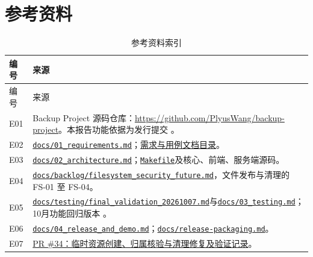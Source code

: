 \section*{参考资料}
\begin{longtable}{L{.10\linewidth}L{.79\linewidth}}
\caption{参考资料索引}\label{tab:references}\\
\toprule 编号 & 来源\\\midrule\endfirsthead\toprule 编号 & 来源\\\midrule\endhead
E01 & Backup Project 源码仓库：\url{https://github.com/PlyusWang/backup-project}。本报告功能依据为发行提交 。\\
E02 & \href{https://github.com/PlyusWang/backup-project/blob/0c07045ec7d4ff7dc6fa3646425c0d119a0f3e6c/docs/01_requirements.md}{\nolinkurl{docs/01_requirements.md}}；\href{https://github.com/PlyusWang/backup-project/tree/0c07045ec7d4ff7dc6fa3646425c0d119a0f3e6c/docs/requirements/}{需求与用例文档目录}。\\
E03 & \href{https://github.com/PlyusWang/backup-project/blob/0c07045ec7d4ff7dc6fa3646425c0d119a0f3e6c/docs/02_architecture.md}{\nolinkurl{docs/02_architecture.md}}；\href{https://github.com/PlyusWang/backup-project/blob/0c07045ec7d4ff7dc6fa3646425c0d119a0f3e6c/Makefile}{\nolinkurl{Makefile}}及核心、前端、服务端源码。\\
E04 & \href{https://github.com/PlyusWang/backup-project/blob/0c07045ec7d4ff7dc6fa3646425c0d119a0f3e6c/docs/backlog/filesystem_security_future.md}{\nolinkurl{docs/backlog/filesystem_security_future.md}}，文件发布与清理的 FS-01 至 FS-04。\\
E05 & \href{https://github.com/PlyusWang/backup-project/blob/0c07045ec7d4ff7dc6fa3646425c0d119a0f3e6c/docs/testing/final_validation_20261007.md}{\nolinkurl{docs/testing/final_validation_20261007.md}}与\href{https://github.com/PlyusWang/backup-project/blob/0c07045ec7d4ff7dc6fa3646425c0d119a0f3e6c/docs/03_testing.md}{\nolinkurl{docs/03_testing.md}}；10月功能回归版本 。\\
E06 & \href{https://github.com/PlyusWang/backup-project/blob/0c07045ec7d4ff7dc6fa3646425c0d119a0f3e6c/docs/04_release_and_demo.md}{\nolinkurl{docs/04_release_and_demo.md}}；\href{https://github.com/PlyusWang/backup-project/blob/0c07045ec7d4ff7dc6fa3646425c0d119a0f3e6c/docs/release-packaging.md}{\nolinkurl{docs/release-packaging.md}}。\\
E07 & \href{https://github.com/PlyusWang/backup-project/pull/34}{PR \#34：临时资源创建、归属核验与清理修复及验证记录}。\\

\end{longtable}
